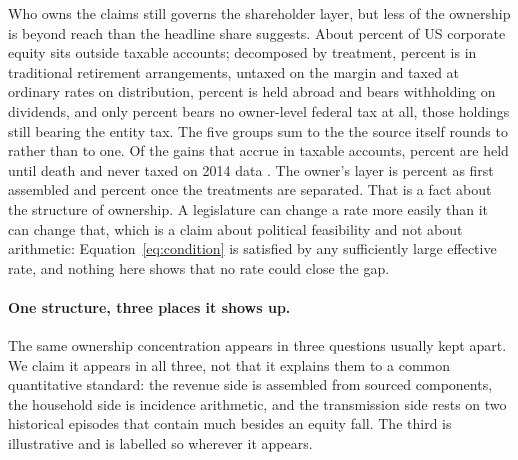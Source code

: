 Who owns the claims still governs the shareholder layer, but less of the ownership is beyond
reach than the headline share suggests. About  percent of US corporate
equity sits outside taxable accounts; decomposed by treatment,  percent is
in traditional retirement arrangements, untaxed on the margin and taxed at ordinary rates on
distribution,  percent is held abroad and bears withholding on dividends,
and only  percent bears no owner-level federal tax at all, those
holdings still bearing the entity tax. The five groups sum to the  the source
itself rounds to rather than to one. Of the gains that
accrue in taxable accounts,  percent are held until death and never
taxed on 2014 data \citep{CBO2014}. The owner's layer is  percent as
first assembled and  percent once the treatments are separated. That is a fact about the structure of
ownership. A legislature can change a rate more easily than it can change that, which is a claim
about political feasibility and not about arithmetic: Equation~\ref{eq:condition} is satisfied by
any sufficiently large effective rate, and nothing here shows that no rate could close the gap.

\paragraph{One structure, three places it shows up.} The same ownership concentration appears
in three questions usually kept apart. We claim it appears in all three, not that it explains
them to a common quantitative standard: the revenue side is assembled from sourced components,
the household side is incidence arithmetic, and the transmission side rests on two historical
episodes that contain much besides an equity fall. The third is illustrative and is labelled so
wherever it appears.

